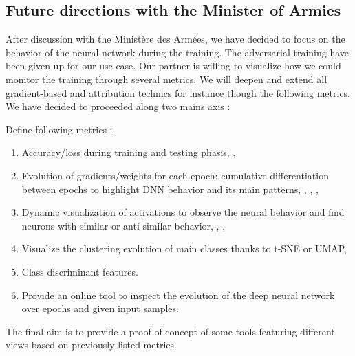 \subsection{Future directions with the Minister of Armies}
\label{subsec42}

After discussion with the Ministère des Armées, we have decided to focus on the behavior of the neural network during the training. The adversarial training have been given up for our use case.
Our partner is willing to visualize how we could monitor the training through several metrics. We will deepen and extend all gradient-based and attribution technics for instance though the following metrics.
We have decided to proceeded along two mains axis :

Define following metrics : 
\begin{enumerate}
	\item Accuracy/loss during training and testing phasis, \cite{Glorot2010}, \cite{Li2017} 
	\item Evolution of gradients/weights for each epoch: cumulative differentiation between epochs to highlight DNN behavior and its main patterns, \cite{Chen2018}, \cite{Yosinski2015},  \cite{Rauber2016}, \cite{Cashman2019}
	\item Dynamic visualization of activations to observe the neural behavior and find neurons with similar or anti-similar behavior, \cite{Chen2018}, \cite{Yosinski2015}, \cite{Carter2019}
	\item Visualize the clustering evolution of main classes thanks to t-SNE or UMAP, \cite{Rauber2016} 
	\item Class discriminant features. \cite{Zintgraf2017}
	\item Provide an online tool to inspect the evolution of the deep neural network over epochs and given input samples.
\end{enumerate}

The final aim is to provide a proof of concept of some tools featuring different views based on previously listed metrics.  

